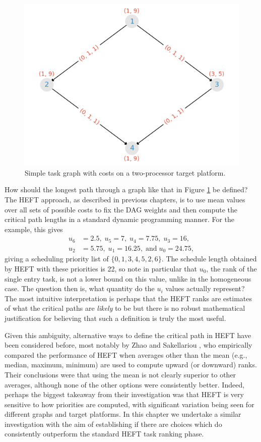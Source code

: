 \documentclass[12pt]{article}
\begin{document}
\begin{figure}
	\centering	
	\includegraphics[scale=0.7]{simple_graph.png}
	\caption{Simple task graph with costs on a two-processor target platform.}	
	\label{plot.simple_example}
\end{figure}

How should the longest path through a graph like that in Figure \ref{plot.simple_example} be defined? The HEFT approach, as described in previous chapters, is to use mean values over all sets of possible costs to fix the DAG weights and then compute the critical path lengths in a standard dynamic programming manner. For the example, this gives
\begin{align*}
u_6 &= 2.5, \; u_5 = 7, \; u_4 = 7.75, \; u_3 = 16, \\
u_2 &= 5.75, \; u_1 = 16.25, \; \text{and} \; u_0 = 24.75,
\end{align*}
giving a scheduling priority list of $\{0, 1, 3, 4, 5, 2, 6\}$. The schedule length obtained by HEFT with these priorities is 22, so note in particular that $u_0$, the rank of the single entry task, is not a lower bound on this value, unlike in the homogeneous case. The question then is, what quantity do the $u_i$ values actually represent? The most intuitive interpretation is perhaps that the HEFT ranks are estimates of what the critical paths are {\em likely} to be but there is no robust mathematical justification for believing that such a definition is truly the most useful.  

Given this ambiguity, alternative ways to define the critical path in HEFT have been considered before, most notably by Zhao and Sakellariou \cite{zhao03}, who empirically compared the performance of HEFT when averages other than the mean (e.g., median, maximum, minimum) are used to compute upward (or downward) ranks. Their conclusions were that using the mean is not clearly superior to other averages, although none of the other options were consistently better. Indeed, perhaps the biggest takeaway from their investigation was that HEFT is very sensitive to how priorities are computed, with significant variation being seen for different graphs and target platforms. In this chapter we undertake a similar investigation with the aim of establishing if there are choices which do consistently outperform the standard HEFT task ranking phase.   
\end{document}
